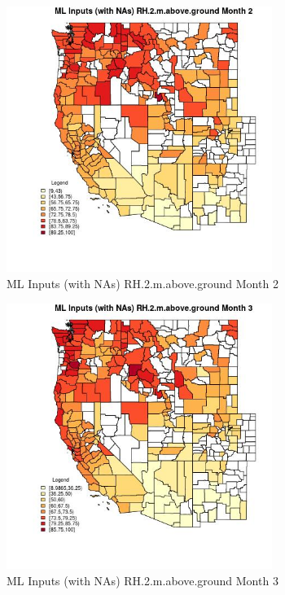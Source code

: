 \begin{figure} 
\centering  
\includegraphics[width=0.77\textwidth]{Code_Outputs/Report_ML_input_PM25_Step4_part_f_de_duplicated_aveswNAs_CountyRH2mabovegroundmedianMonth2.jpg} 
\caption{\label{fig:Report_ML_input_PM25_Step4_part_f_de_duplicated_aveswNAsCountyRH2mabovegroundmedianMonth2}ML Inputs (with NAs) RH.2.m.above.ground Month 2} 
\end{figure} 
 

\clearpage 

\begin{figure} 
\centering  
\includegraphics[width=0.77\textwidth]{Code_Outputs/Report_ML_input_PM25_Step4_part_f_de_duplicated_aveswNAs_CountyRH2mabovegroundmedianMonth3.jpg} 
\caption{\label{fig:Report_ML_input_PM25_Step4_part_f_de_duplicated_aveswNAsCountyRH2mabovegroundmedianMonth3}ML Inputs (with NAs) RH.2.m.above.ground Month 3} 
\end{figure} 
 

